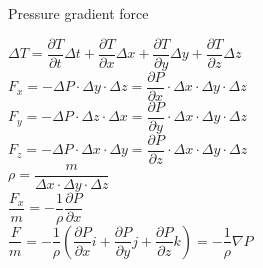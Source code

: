 \documentclass[11pt]{beamer}
\begin{document}
\begin{frame}{Pressure gradient force}\footnotesize

	$ \Delta T = \dfrac{\partial T}{\partial t} \Delta t 
	+ \dfrac{\partial T}{\partial x} \Delta x 
	+ \dfrac{\partial T}{\partial y} \Delta y 
	+ \dfrac{\partial T}{\partial z} \Delta z $\\
	
	$ F_{x} = - \Delta P \cdot \Delta y \cdot \Delta z 
	= \dfrac{\partial P}{\partial x} \cdot \Delta x \cdot \Delta y \cdot \Delta z $\\
	
	$ F_{y} = - \Delta P \cdot \Delta z \cdot \Delta x 
	= \dfrac{\partial P}{\partial y} \cdot \Delta x \cdot \Delta y \cdot \Delta z $\\
	
	$ F_{z} = - \Delta P \cdot \Delta x \cdot \Delta y 
	= \dfrac{\partial P}{\partial z} \cdot \Delta x \cdot \Delta y \cdot \Delta z $\\
	
	$ \rho = \dfrac {m}{\Delta x \cdot \Delta y \cdot \Delta z} $ \\
	
	$ \dfrac {F_{x}}{m} = - \dfrac{1}{\rho} \dfrac{\partial P}{\partial x} $ \\
	
	$ \dfrac {F}{m} = - \dfrac{1}{\rho} \left( \dfrac{\partial P}{\partial x} i + \dfrac{\partial P}{\partial y} j + \dfrac{\partial P}{\partial z} k \right) 
	= - \dfrac{1}{\rho} \nabla P$ \\

\end{frame}
\end{document}
